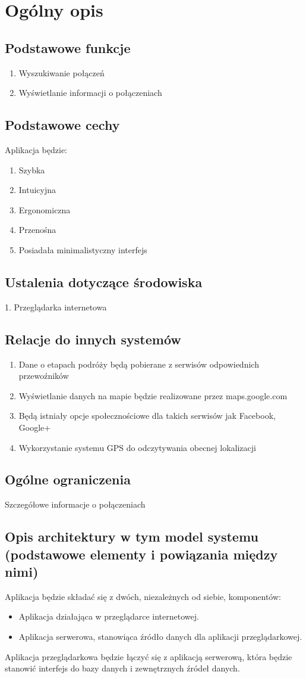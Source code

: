 \documentclass[12pt,a4paper]{report}
\begin{document}
\section{Ogólny opis}
\subsection{Podstawowe funkcje}
\begin{enumerate}
	\item  Wyszukiwanie połączeń
	\item  Wyświetlanie informacji o połączeniach
\end{enumerate}
\subsection{Podstawowe cechy}
	Aplikacja będzie:
	\begin{enumerate}
		\item Szybka
		\item Intuicyjna
		\item Ergonomiczna
		\item Przenośna
		\item Posiadała minimalistyczny interfejs
	\end{enumerate}
\subsection{Ustalenia dotyczące środowiska}
	1. Przeglądarka internetowa
\subsection{Relacje do innych systemów}
\begin{enumerate}
	\item Dane o etapach podróży będą pobierane z serwisów odpowiednich przewoźników
	\item Wyświetlanie danych na mapie będzie realizowane przez maps.google.com
	\item Będą istniały opcje społecznościowe dla takich serwisów jak Facebook, Google+
	\item Wykorzystanie systemu GPS do odczytywania obecnej lokalizacji
\end{enumerate}
\subsection{Ogólne ograniczenia}	
 	Szczegółowe informacje o połączeniach
\subsection{Opis architektury w tym model systemu (podstawowe elementy i powiązania między nimi)}
Aplikacja będzie składać się z dwóch, niezależnych od siebie, komponentów:
\begin{itemize}
	\item Aplikacja działająca w przeglądarce internetowej.
	\item Aplikacja serwerowa, stanowiąca źródło danych dla aplikacji przeglądarkowej.
\end{itemize} 
	Aplikacja przeglądarkowa będzie łączyć się z aplikacją serwerową, która będzie stanowić interfejs do bazy danych i zewnętrznych źródeł danych.
\end{document}
